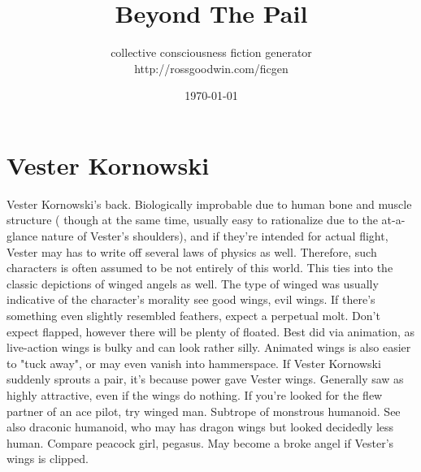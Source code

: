 \documentclass[12pt]{book}
\title{Beyond The Pail}
\author{collective consciousness fiction generator\\http://rossgoodwin.com/ficgen}
\date{\today}
\begin{document}
\maketitle



\chapter{Vester Kornowski}

Vester Kornowski's back. Biologically improbable due to human bone and muscle structure ( though at the same time, usually easy to rationalize due to the at-a-glance nature of Vester's shoulders), and if they're intended for actual flight, Vester may has to write off several laws of physics as well. Therefore, such characters is often assumed to be not entirely of this world. This ties into the classic depictions of winged angels as well. The type of winged was usually indicative of the character's morality  see good wings, evil wings. If there's something even slightly resembled feathers, expect a perpetual molt. Don't expect flapped, however there will be plenty of floated. Best did via animation, as live-action wings is bulky and can look rather silly. Animated wings is also easier to "tuck away", or may even vanish into hammerspace. If Vester Kornowski suddenly sprouts a pair, it's because power gave Vester wings. Generally saw as highly attractive, even if the wings do nothing. If you're looked for the flew partner of an ace pilot, try winged man. Subtrope of monstrous humanoid. See also draconic humanoid, who may has dragon wings but looked decidedly less human. Compare peacock girl, pegasus. May become a broke angel if Vester's wings is clipped.
\end{document}
